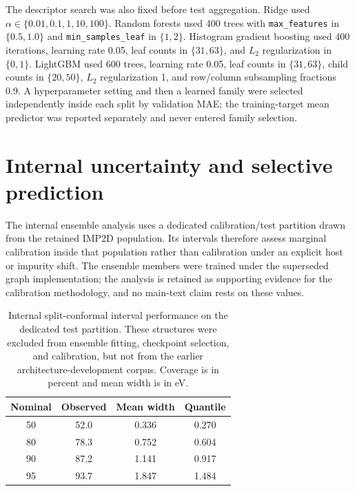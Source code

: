\documentclass[aps,prb,onecolumn,superscriptaddress,floatfix]{revtex4-2}
\begin{document}
The descriptor search was also fixed before test aggregation.  Ridge used
$\alpha\in\{0.01,0.1,1,10,100\}$.  Random forests used 400 trees with
\texttt{max\_features} in $\{0.5,1.0\}$ and
\texttt{min\_samples\_leaf} in $\{1,2\}$.  Histogram gradient boosting used
400 iterations, learning rate 0.05, leaf counts in $\{31,63\}$, and
$L_2$ regularization in $\{0,1\}$.  LightGBM used 600 trees, learning rate
0.05, leaf counts in $\{31,63\}$, child counts in $\{20,50\}$,
$L_2$ regularization 1, and row/column subsampling fractions 0.9.  A
hyperparameter setting and then a learned family were selected independently
inside each split by validation MAE; the training-target mean predictor was
reported separately and never entered family selection.

\clearpage
\section{Internal uncertainty and selective prediction}

The internal ensemble analysis uses a dedicated calibration/test partition
drawn from the retained IMP2D population.  Its intervals therefore assess
marginal calibration inside that population rather than calibration under an
explicit host or impurity shift.  The ensemble members were trained under the
superseded graph implementation; the analysis is retained as supporting
evidence for the calibration methodology, and no main-text claim rests on
these values.

\begin{table}[h!]
\caption{Internal split-conformal interval performance on the dedicated test
partition. These structures were excluded from ensemble fitting, checkpoint
selection, and calibration, but not from the earlier architecture-development
corpus. Coverage is in percent and mean width is in eV.}
\label{tab:uq}
\centering
\begin{tabular}{cccc}
\toprule
Nominal & Observed & Mean width & Quantile \\
\midrule
50 & 52.0 & 0.336 & 0.270 \\
80 & 78.3 & 0.752 & 0.604 \\
90 & 87.2 & 1.141 & 0.917 \\
95 & 93.7 & 1.847 & 1.484 \\
\bottomrule
\end{tabular}
\end{table}
\end{document}
